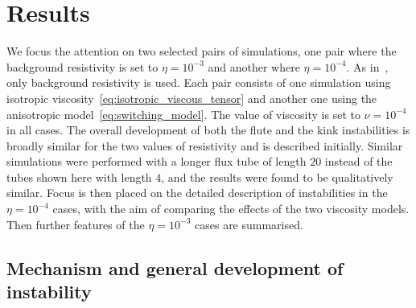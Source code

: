 \documentclass[fleqn,usenatbib]{mnras}
\newcommand{\rs}[2]{{#2}}
\begin{document}
\section{Results}
\label{sec-results}

\rs{Two pairs of simulations were performed,}{We focus the attention
on two selected pairs of  
simulations, one pair where the background resistivity is set to
$\eta=10^{-3}$ and another where $\eta=10^{-4}$. As
in~\citet{quinnEffectAnisotropicViscosity2020}, only background
resistivity is used. Each pair consists of one simulation
using isotropic viscosity~\eqref{eq:isotropic_viscous_tensor} and
another one using the \rs{switching}{anisotropic} model~\eqref{eq:switching_model}. The
value of viscosity is set to $\nu = 10^{-4}$ in all cases.} 
%
The overall development of both \rs{}{the flute and the kink}
instabilities is broadly similar for the two values of resistivity and
is described  initially. Similar simulations were performed with a longer flux tube of length $20$ instead of the tubes shown here with length $4$, and the results were found to be qualitatively similar. Focus is 
then placed on the \rs{development of}{detailed description of instabilities in} the
$\eta=10^{-4}$ cases, \rs{comparing the results}{with the aim of comparing the effects} of the two
viscosity models. \rs{These cases illustrate the development of the instabilities while showcasing the effect of the
viscosity models.}{} Then \rs{differences apparent in}{further features of} the $\eta=10^{-3}$
cases are summarised. \rs{without a full exploration of the (qualitatively
similar) results.}{}

\subsection{\rs{Overview of instability development}{Mechanism and
    general development of instability}}
\end{document}
